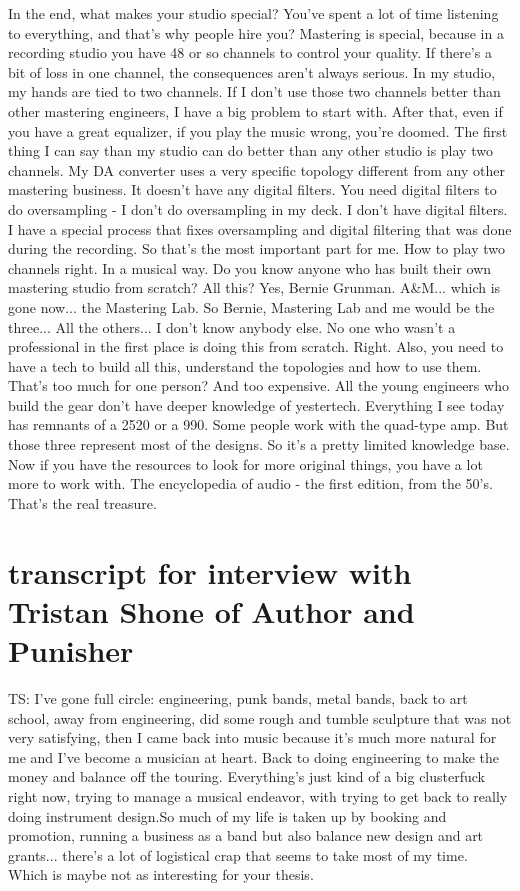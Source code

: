 In the end, what makes your studio special? You've spent a lot of time listening to everything, and that's why people hire you?
Mastering is special, because in a recording studio you have 48 or so channels to control your quality. If there's a bit of loss in one channel, the consequences aren't always serious. In my studio, my hands are tied to two channels. If I don't use those two channels better than other mastering engineers, I have a big problem to start with.
After that, even if you have a great equalizer, if you play the music wrong, you're doomed. The first thing I can say than my studio can do better than any other studio is play two channels. My DA converter uses a very specific topology different from any other mastering business. It doesn't have any digital filters. You need digital filters to do oversampling - I don't do oversampling in my deck. I don't have digital filters. I have a special process that fixes oversampling and digital filtering that was done during the recording.
So that's the most important part for me. How to play two channels right. In a musical way.
Do you know anyone who has built their own mastering studio from scratch?
All this? Yes, Bernie Grunman. A\&M... which is gone now... the Mastering Lab. So Bernie, Mastering Lab and me would be the three... All the others... I don't know anybody else.
No one who wasn't a professional in the first place is doing this from scratch.
Right. Also, you need to have a tech to build all this, understand the topologies and how to use them.
That's too much for one person?
And too expensive. All the young engineers who build the gear don't have deeper knowledge of yestertech. Everything I see today has remnants of a 2520 or a 990. Some people work with the quad-type amp. But those three represent most of the designs. So it's a pretty limited knowledge base. Now if you have the resources to look for more original things, you have a lot more to work with. The encyclopedia of audio - the first edition, from the 50's. That's the real treasure.

\section{transcript for interview with Tristan Shone of Author and Punisher}
TS: I've gone full circle: engineering, punk bands, metal bands, back to art school, away from engineering, did some rough and tumble sculpture that was not very satisfying, then I came back into music because it's much more natural for me and I've become a musician at heart. Back to doing engineering to make the money and balance off the touring. Everything's just kind of a big clusterfuck right now, trying to manage a musical endeavor, with trying to get back to really doing instrument design.So much of my life is taken up by booking and promotion, running a business as a band but also balance new design and art grants... there's a lot of logistical crap that seems to take most of my time. Which is maybe not as interesting for your thesis. 

